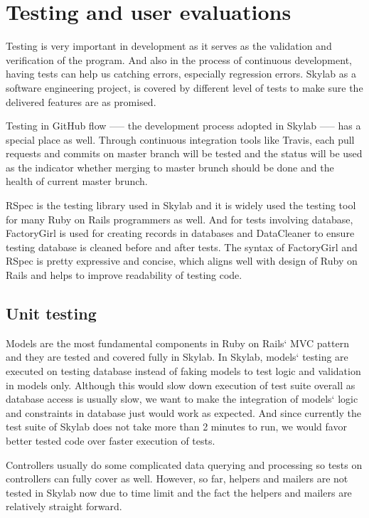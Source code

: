 \chapter{Testing and user evaluations} \label{testing}

Testing is very important in development as it serves as the validation and verification of the program\cite{citationtesting}. And also in the process of continuous development, having tests can help us catching errors, especially regression errors. Skylab as a software engineering project, is covered by different level of tests to make sure the delivered features are as promised.

Testing in GitHub flow —-- the development process adopted in Skylab —-- has a special place as well. Through continuous integration tools like Travis, each pull requests and commits on master branch will be tested and the status will be used as the indicator whether merging to master brunch should be done and the health of current master brunch.

RSpec is the testing library used in Skylab and it is widely used the testing tool for many Ruby on Rails programmers as well\cite{citationrspec}. And for tests involving database, FactoryGirl is used for creating records in databases and DataCleaner to ensure testing database is cleaned before and after tests. The syntax of FactoryGirl and RSpec is pretty expressive and concise, which aligns well with design of Ruby on Rails and helps to improve readability of testing code.

\section{Unit testing} \label{unittesting}

Models are the most fundamental components in Ruby on Rails` MVC pattern and they are tested and covered fully in Skylab. In Skylab, models` testing are executed on testing database instead of faking models to test logic and validation in models only. Although this would slow down execution of test suite overall as database access is usually slow, we want to make the integration of models` logic and constraints in database just would work as expected. And since currently the test suite of Skylab does not take more than 2 minutes to run, we would favor better tested code over faster execution of tests.

Controllers usually do some complicated data querying and processing so tests on controllers can fully cover as well. However, so far, helpers and mailers are not tested in Skylab now due to time limit and the fact the helpers and mailers are relatively straight forward.


